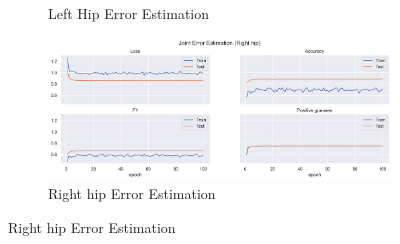 \begin{figure}[!ht]
\begin{subfigure}[b]{0.47\linewidth}
      \caption{Left Hip Error Estimation}
      \label{fig:v1_lehi_jt_ee}
  \end{subfigure}
  \hfill
  \begin{subfigure}[b]{0.47\linewidth}
      \centering
      \includegraphics[width=\textwidth]{figures/Results/v1_bs_60_is_64_e_100/jt/Right hip_ErrorEstimation.png}
      \caption{Right hip Error Estimation}
      \label{fig:v1_rihi_jt_ee}
  \end{subfigure}
\end{figure}


